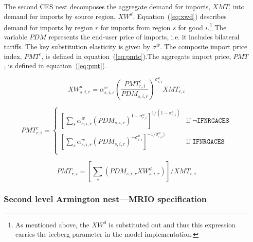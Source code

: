 \documentclass[11pt,letterpaper]{report}
\begin{document}
The second CES nest decomposes the aggregate demand for imports, $\mathit{XMT}$,
into demand for imports by source region, $\mathit{XW^d}$.
Equation~(\ref{eq:xwd}) describes demand for imports by region $r$ for imports
from region $s$ for good $i$.\footnote{As mentioned above, the $\mathit{XW^d}$
is substituted out and thus this expression carries the iceberg parameter in the
model implementation.} The variable $\mathit{PDM}$ represents the end-user price
of imports, i.e. it includes bilateral tariffs. The key substitution elasticity
is given by $\sigma^{\mathit{w}}$. The composite import price index, $\mathit{PMT}^c$,
is defined in
equation~(\ref{eq:pmtc}).The aggregate import price, $\mathit{PMT}$,
is defined in
equation~(\ref{eq:pmt}).

\begin{equation}
\label{eq:xwd}
\mathit{XW}^d_{s,i,r} =
   \alpha^{\mathit{w}}_{s,i,r}
   \left( \frac {\mathit{PMT}^c_{r,i}} {\mathit{PDM}_{s,i,r}}
   \right)^{\sigma^{\mathit{w}}_{r,\mathit{i}}}
   \mathit{XMT}_{r,i}
\end{equation}

\begin{equation}
\label{eq:pmtc}
\mathit{PMT}^c_{r,i} =
\begin{cases}
\left[\displaystyle
   \sum_s{
      \alpha^{\mathit{w}}_{s,i,r}
      \left( \mathit{PDM}_{s,i,r}
      \right)^{1-\sigma^{\mathit{w}}_{r,\mathit{i}}}
   }
\right]^{1/(1-\sigma^{\mathit{w}}_{r,\mathit{i}})}
&    \textrm{if } \lnot \texttt{IFNRGACES} \\
\left[\displaystyle
   \sum_s{
      \alpha^{\mathit{w}}_{s,i,r}
      \left( \mathit{PDM}_{s,i,r}
      \right)^{-\sigma^{\mathit{w}}_{r,\mathit{i}}}
   }
\right]^{-1/\sigma^{\mathit{w}}_{r,\mathit{i}})}
&    \textrm{if } \texttt{IFNRGACES} \\
\end{cases}
\end{equation}

\begin{equation}
\label{eq:pmt}
\mathit{PMT}_{r,i} =
\left[
   \sum_s{
      \left( \mathit{PDM}_{s,i,r}\mathit{XW}^d_{s,i,r}
      \right)
   }
\right] \bigg / \mathit{XMT}_{r,i}
\end{equation}

\subsubsection{Second level Armington nest---MRIO specification}
\end{document}

